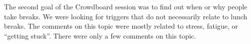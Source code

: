 The second goal of the Crowdboard session was to find out when or why people take breaks. We were looking for triggers that do not necessarily relate to lunch breaks. The comments on this topic were mostly related to stress, fatigue, or ``getting stuck''. There were only a few comments on this topic.

